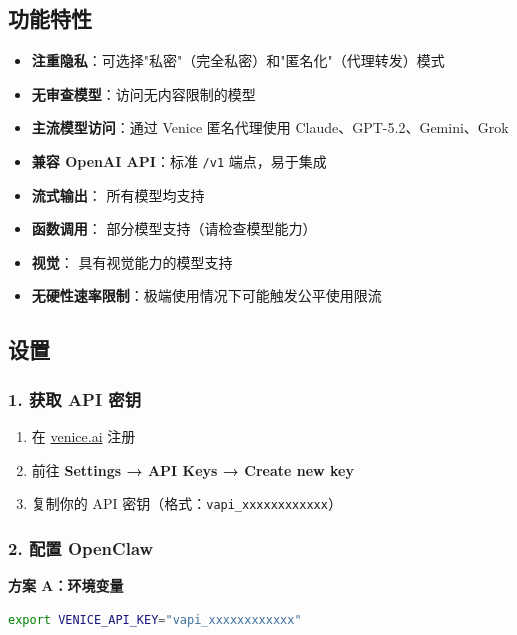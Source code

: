 \subsection{功能特性}


\begin{itemize}
  \item \textbf{注重隐私}：可选择"私密"（完全私密）和"匿名化"（代理转发）模式
  \item \textbf{无审查模型}：访问无内容限制的模型
  \item \textbf{主流模型访问}：通过 Venice 匿名代理使用 Claude、GPT-5.2、Gemini、Grok
  \item \textbf{兼容 OpenAI API}：标准 \texttt{/v1} 端点，易于集成
  \item \textbf{流式输出}： 所有模型均支持
  \item \textbf{函数调用}： 部分模型支持（请检查模型能力）
  \item \textbf{视觉}： 具有视觉能力的模型支持
  \item \textbf{无硬性速率限制}：极端使用情况下可能触发公平使用限流
\end{itemize}


\subsection{设置}


\subsubsection{1. 获取 API 密钥}


\begin{enumerate}
  \item 在 \href{https://venice.ai}{venice.ai} 注册
  \item 前往 \textbf{Settings → API Keys → Create new key}
  \item 复制你的 API 密钥（格式：\texttt{vapi\_xxxxxxxxxxxx}）
\end{enumerate}


\subsubsection{2. 配置 OpenClaw}


\textbf{方案 A：环境变量}

\begin{lstlisting}[language=bash]
export VENICE_API_KEY="vapi_xxxxxxxxxxxx"
\end{lstlisting}


